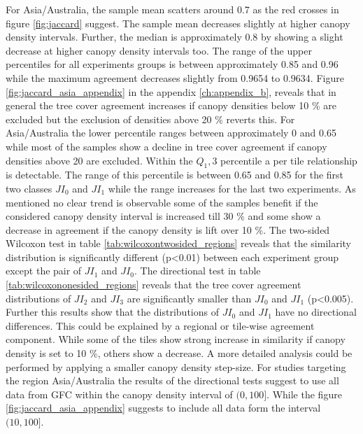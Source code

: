 			For Asia/Australia, the sample mean scatters around 0.7 as the red crosses in figure \ref{fig:jaccard} suggest. The sample mean decreases slightly at higher canopy density intervals. Further, the median is approximately 0.8 by showing a slight decrease at higher canopy density intervals too. The range of the upper percentiles for all experiments groups is between approximately 0.85 and 0.96 while the maximum agreement decreases slightly from 0.9654 to 0.9634. Figure \ref{fig:jaccard_asia_appendix} in the appendix \ref{ch:appendix_b}, reveals that in general the tree cover agreement increases if canopy densities below 10 \% are excluded but the exclusion of densities above 20 \% reverts this. For Asia/Australia the lower percentile ranges between approximately 0 and 0.65 while most of the samples show a decline in tree cover agreement if canopy densities above 20 are excluded. Within the $Q_1,3$ percentile a per tile relationship is detectable. The range of this percentile is between 0.65 and 0.85 for the first two classes $JI_0$ and $JI_1$ while the range increases for the last two experiments. As mentioned no clear trend is observable some of the samples benefit if the considered canopy density interval is increased till 30 \% and some show a decrease in agreement if the canopy density is lift over 10 \%. The two-sided Wilcoxon test in table \ref{tab:wilcoxontwosided_regions} reveals that the similarity distribution is significantly different (p<0.01) between each experiment group except the pair of $JI_1$ and $JI_0$. The directional test in table \ref{tab:wilcoxononesided_regions} reveals that the tree cover agreement distributions of $JI_2$ and $JI_3$ are significantly smaller than $JI_0$ and $JI_1$ (p<0.005). Further this results show that the distributions of $JI_0$ and $JI_1$ have no directional differences. This could be explained by a regional or tile-wise agreement component. While some of the tiles show strong increase in similarity if canopy density is set to 10 \%, others show a decrease. A more detailed analysis could be performed by applying a smaller canopy density step-size. For studies targeting the region Asia/Australia the results of the directional tests suggest to use all data from \ac{GFC} within the canopy density interval of $(0,100]$. While the figure \ref{fig:jaccard_asia_appendix} suggests to include all data form the interval $(10,100]$.

